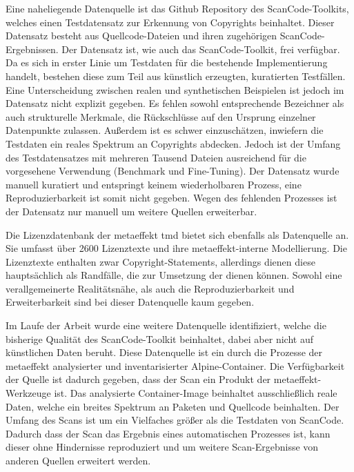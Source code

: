 Eine naheliegende Datenquelle ist das Github Repository des ScanCode-Toolkits, welches einen Testdatensatz zur Erkennung von Copyrights beinhaltet.
Dieser Datensatz besteht aus Quellcode-Dateien und ihren zugehörigen ScanCode-Ergebnissen.
Der Datensatz ist, wie auch das ScanCode-Toolkit, frei verfügbar.
Da es sich in erster Linie um Testdaten für die bestehende Implementierung handelt, bestehen diese zum Teil aus künstlich erzeugten, kuratierten Testfällen.
Eine Unterscheidung zwischen realen und synthetischen Beispielen ist jedoch im Datensatz nicht explizit gegeben.
Es fehlen sowohl entsprechende Bezeichner als auch strukturelle Merkmale, die Rückschlüsse auf den Ursprung einzelner Datenpunkte zulassen.
Außerdem ist es schwer einzuschätzen, inwiefern die Testdaten ein reales Spektrum an Copyrights abdecken.
Jedoch ist der Umfang des Testdatensatzes mit mehreren Tausend Dateien ausreichend für die vorgesehene Verwendung (Benchmark und Fine-Tuning).
Der Datensatz wurde manuell kuratiert und entspringt keinem wiederholbaren Prozess, eine Reproduzierbarkeit ist somit nicht gegeben.
Wegen des fehlenden Prozesses ist der Datensatz nur manuell um weitere Quellen erweiterbar.

Die Lizenzdatenbank der metaeffekt \gls{tmd} bietet sich ebenfalls als Datenquelle an.
Sie umfasst über \num{2600} Lizenztexte und ihre metaeffekt-interne Modellierung.
Die Lizenztexte enthalten zwar Copyright-Statements, allerdings dienen diese hauptsächlich als Randfälle, die zur Umsetzung der  dienen können.
Sowohl eine verallgemeinerte Realitätsnähe, als auch die Reproduzierbarkeit und Erweiterbarkeit sind bei dieser Datenquelle kaum gegeben.

Im Laufe der Arbeit wurde eine weitere Datenquelle identifiziert, welche die bisherige Qualität des ScanCode-Toolkit beinhaltet, dabei aber nicht auf künstlichen Daten beruht.
Diese Datenquelle ist ein durch die Prozesse der metaeffekt analysierter und inventarisierter Alpine-Container.
Die Verfügbarkeit der Quelle ist dadurch gegeben, dass der Scan ein Produkt der metaeffekt-Werkzeuge ist.
Das analysierte Container-Image beinhaltet ausschließlich reale Daten, welche ein breites Spektrum an Paketen und Quellcode beinhalten.
Der Umfang des Scans ist um ein Vielfaches größer als die Testdaten von ScanCode.
Dadurch dass der Scan das Ergebnis eines automatischen Prozesses ist, kann dieser ohne Hindernisse reproduziert und um weitere Scan-Ergebnisse von anderen Quellen erweitert werden.

